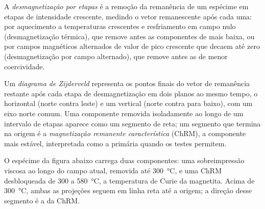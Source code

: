 \begin{definition}\label{def:b3:palaeomagnetism:demag}
A \emph{desmagnetização por etapas} é a remoção
da remanência de um espécime em etapas de intensidade crescente, medindo o
vetor remanescente após cada uma: por aquecimento a temperaturas crescentes e resfriamento
em campo nulo (desmagnetização térmica), que remove antes as componentes de
 mais baixa, ou por campos magnéticos alternados de valor de pico
crescente que decaem até zero (desmagnetização por campo alternado), que remove
antes as de menor coercividade.
\end{definition}

\begin{definition}\label{def:b3:palaeomagnetism:zijderveld}
Um \emph{diagrama de Zijderveld} representa os pontos finais do
vetor de remanência restante após cada etapa de desmagnetização em dois planos
ao mesmo tempo, o horizontal (norte contra leste) e um vertical (norte
contra para baixo), com um eixo norte comum. Uma componente removida isoladamente ao longo de um intervalo
de etapas aparece como um segmento de reta; um segmento que termina na origem é a
\emph{magnetização remanente característica}
(ChRM), a componente mais estável, interpretada como a primária
quando os testes permitem.
\end{definition}

O espécime da figura abaixo carrega duas componentes: uma sobreimpressão viscosa
ao longo do campo atual, removida até \qty{300}{\celsius}, e uma ChRM
desbloqueada de 300 a \qty{580}{\celsius}, a temperatura de Curie da magnetita.
Acima de \qty{300}{\celsius}, ambas as projeções seguem em linha reta até a origem; a
direção desse segmento é a da ChRM.

